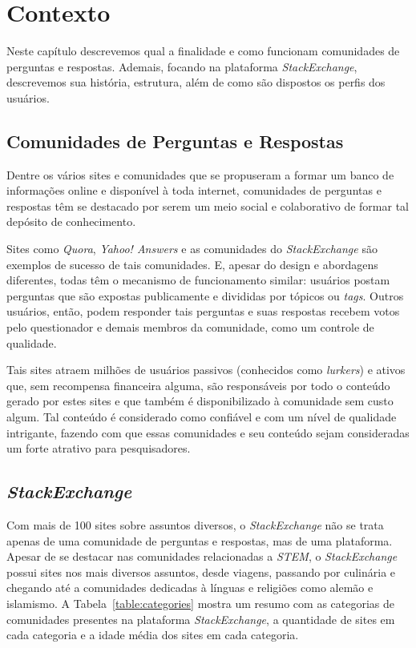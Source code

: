 \chapter{Contexto}
\label{ch:contexto}

Neste capítulo descrevemos qual a finalidade e como funcionam comunidades de perguntas e respostas. Ademais, focando na plataforma \emph{StackExchange}, descrevemos sua história, estrutura, além de como são dispostos os perfis dos usuários.

\section{Comunidades de Perguntas e Respostas} %
\label{sec:comunidades_de_perguntas_e_respostas}
Dentre os vários sites e comunidades que se propuseram a formar um banco de informações online e disponível à toda internet, comunidades de perguntas e respostas têm se destacado por serem um meio social e colaborativo de formar tal depósito de conhecimento.

Sites como \emph{Quora}, \emph{Yahoo! Answers} e as comunidades do \emph{StackExchange} são exemplos de sucesso de tais comunidades. E, apesar do design e abordagens diferentes, todas têm o mecanismo de funcionamento similar: usuários postam perguntas que são expostas publicamente e divididas por tópicos ou \emph{tags}. Outros usuários, então, podem responder tais perguntas e suas respostas recebem votos pelo questionador e demais membros da comunidade, como um controle de qualidade.

Tais sites atraem milhões de usuários passivos (conhecidos como \emph{lurkers}) e ativos que, sem recompensa financeira alguma, são responsáveis por todo o conteúdo gerado por estes sites e que também é disponibilizado à comunidade sem custo algum. Tal conteúdo é considerado como confiável e com um nível de qualidade intrigante, fazendo com que essas comunidades e seu conteúdo sejam consideradas um forte atrativo para pesquisadores.


\section{\emph{StackExchange}}

Com mais de 100 sites sobre assuntos diversos, o \emph{StackExchange} não se trata apenas de uma comunidade de perguntas e respostas, mas de uma plataforma. Apesar de se destacar nas comunidades relacionadas a \emph{STEM}, o \emph{StackExchange} possui sites nos mais diversos assuntos, desde viagens, passando por culinária e chegando até a comunidades dedicadas à línguas e religiões como alemão e islamismo. A Tabela~\ref{table:categories} mostra um resumo com as categorias de comunidades presentes na plataforma \emph{StackExchange}, a quantidade de sites em cada categoria e a idade média dos sites em cada categoria.

